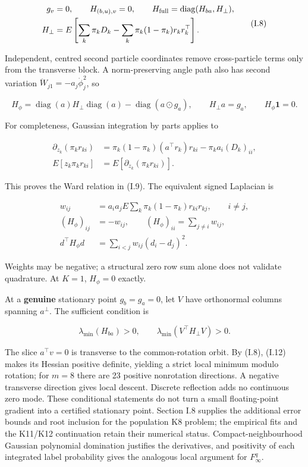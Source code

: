 \documentclass{article}
\begin{document}
\[
\begin{aligned}
g_v&=0,\qquad H_{(b,u),v}=0,\qquad
H_{\rm full}=\operatorname{diag}(H_{ba},H_\perp),\\
H_\perp&=E\left[\sum_k\pi_kD_k-\sum_k\pi_k(1-\pi_k)r_kr_k^\top\right].
\end{aligned}
\tag{I.8}
\]

Independent, centred second particle coordinates remove cross-particle
terms only from the transverse block. A norm-preserving angle path also
has second variation \(\ddot W_{j1}=-a_j\dot\phi_j^2\), so

\[
H_\phi=\operatorname{diag}(a)H_\perp\operatorname{diag}(a)
-\operatorname{diag}(a\odot g_a),\qquad H_\perp a=g_a,\qquad H_\phi\mathbf1=0.
\tag{I.9}
\]

For completeness, Gaussian integration by parts applies to

\[
\begin{aligned}
\partial_{z_k}(\pi_kr_{ki})
&=\pi_k(1-\pi_k)(a^\top r_k)r_{ki}-\pi_ka_i(D_k)_{ii},\\
E[z_k\pi_kr_{ki}]&=E[\partial_{z_k}(\pi_kr_{ki})].
\end{aligned}
\tag{I.10}
\]

This proves the Ward relation in (I.9). The equivalent signed Laplacian
is

\[
\begin{aligned}
w_{ij}&=a_ia_jE\sum_k\pi_k(1-\pi_k)r_{ki}r_{kj},\qquad i\ne j,\\
(H_\phi)_{ij}&=-w_{ij},\qquad (H_\phi)_{ii}=\sum_{j\ne i}w_{ij},\\
d^\top H_\phi d&=\sum_{i<j}w_{ij}(d_i-d_j)^2.
\end{aligned}
\tag{I.11}
\]

Weights may be negative; a structural zero row sum alone does not
validate quadrature. At \(K=1\), \(H_\phi=0\) exactly.

At a \textbf{genuine} stationary point \(g_b=g_a=0\), let \(V\) have
orthonormal columns spanning \(a^\perp\). The sufficient condition is

\[
\lambda_{\min}(H_{ba})>0,\qquad
\lambda_{\min}(V^\top H_\perp V)>0.
\tag{I.12}
\]

The slice \(a^\top v=0\) is transverse to the common-rotation orbit. By
(I.8), (I.12) makes its Hessian positive definite, yielding a strict
local minimum modulo rotation; for \(m=8\) there are 23 positive
nonrotation directions. A negative transverse direction gives local
descent. Discrete reflection adds no continuous zero mode. These
conditional statements do not turn a small floating-point gradient into
a certified stationary point. Section I.8 supplies the additional error
bounds and root inclusion for the population K8 problem; the empirical
fits and the K11/K12 continuation retain their numerical status.
Compact-neighbourhood Gaussian polynomial domination justifies the
derivatives, and positivity of each integrated label probability gives
the analogous local argument for \(F_\infty^q\).
\end{document}
